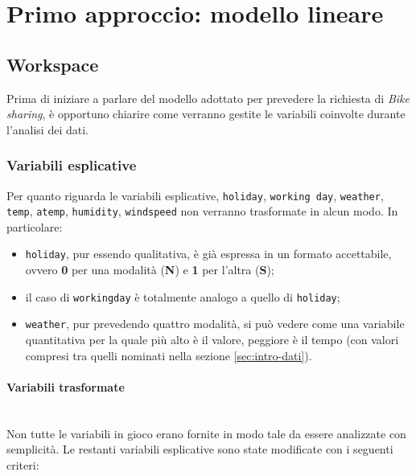 \section{Primo approccio: modello lineare}\label{sec:linear-model}

\subsection{Workspace}

Prima di iniziare a parlare del modello adottato per prevedere la richiesta di
\emph{Bike sharing}, è opportuno chiarire come verranno gestite le variabili
coinvolte durante l'analisi dei dati.

\subsubsection{Variabili esplicative}\label{sec:modlin-work-espl}
Per quanto riguarda le variabili esplicative, \texttt{holiday},
\texttt{working day}, \texttt{weather}, \texttt{temp}, \texttt{atemp},
\texttt{humidity}, \texttt{windspeed} non verranno trasformate in alcun modo.
In particolare:

\begin{itemize}
\item \texttt{holiday}, pur essendo qualitativa, è già espressa in un formato
  accettabile, ovvero \textbf{0} per una modalità (\textbf{N}) e \textbf{1}
  per l'altra (\textbf{S});
\item il caso di \texttt{workingday} è totalmente analogo a quello di
  \texttt{holiday};
\item \texttt{weather}, pur prevedendo quattro modalità, si può vedere come
  una variabile quantitativa per la quale più alto è il valore, peggiore è il
  tempo (con valori compresi tra quelli nominati nella sezione
  \ref{sec:intro-dati}).
\end{itemize}

\paragraph{Variabili trasformate} \mbox{}\\
Non tutte le variabili in gioco erano fornite in modo tale da essere
analizzate con semplicità.
Le restanti variabili esplicative sono state modificate con i seguenti criteri:

